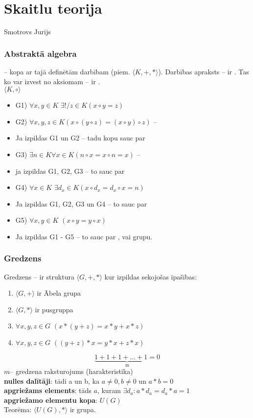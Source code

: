 \section{Skaitlu teorija}
Smotrovs Jurijs \\

\subsubsection{Abstraktā algebra}
 -- kopa ar tajā definētām darbībam (piem. $\langle K, +, * \rangle$).
Darbības apraksts -- ir . Tas ko var izvest no aksiomam -- ir . \\

$\langle K, \circ \rangle$
\begin{itemize}
  \item G1)  $\forall x,y \in K$ $\exists! / z \in K (x \circ y = z)$
  \item G2) $\forall x, y, z \in K (x \circ (y \circ z) = (x \circ y) \circ z)$ -- 
  \item Ja izpildas G1 un G2 -- tadu kopu sauc par 
  \item G3) $\exists n \in K \forall x \in K (n \circ x = x \circ n = x)$ -- 
  \item ja izpildas G1, G2, G3 -- to sauc par 
  \item G4) $\forall x \in K$  $\exists d_x \in K (x \circ d_x = d_x \circ x = n)$
  \item Ja izpildas G1, G2, G3 un G4 -- to sauc par 
  \item G5) $\forall x, y \in K $ $(x \circ y = y \circ x)$ 
  \item Ja izpildas G1 - G5 -- to sauc par , vai  grupu.
\end{itemize}

\subsubsection{Gredzens}
Gredzens -- ir struktura $\langle G, +, * \rangle$ kur izpildas sekojošas īpašības:
\begin{enumerate}
  \item $\langle G, + \rangle$ ir Ābela grupa
  \item $\langle G, * \rangle$ ir pusgruppa
  \item $\forall x,y, z \in G $ $(x * (y + z) = x * y + x * z)$
  \item $\forall x, y, z \in G$ $( (y + z) * x = y * x + z * x)$
\end{enumerate}
$$\underbrace{1 + 1 + 1 + ... + 1 = 0}_\text{m}$$
\textbf{$m$}-- gredzena raksturojums (harakteristika) \\
\textbf{nulles dalītāji}: tādi a un b, ka $a \ne 0, b \ne 0 $ un $a * b = 0$ \\
\textbf{apgriežams elements}: tāds $a$, kuram $\exists d_a: a * d_a = d_a * a = 1$ \\
\textbf{apgriežamo elementu kopa}: $U(G)$\\
Teorēma: $\langle U(G), * \rangle$ ir grupa.



